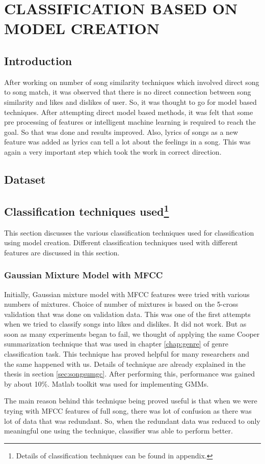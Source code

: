 \chapter{CLASSIFICATION BASED ON MODEL CREATION}
 \label{chap:modelIntro}
\section{Introduction}
After working on number of song similarity techniques which involved direct song to song match, it was observed that there is no direct connection between song similarity and likes and dislikes of user. So, it was thought to go for model based techniques. After attempting direct model based methods, it was felt that some pre processing of features or intelligent machine learning is required to reach the goal. So that was done and results improved. Also, lyrics of songs as a new feature was added as lyrics can tell a lot about the feelings in a song. This was again a very important step which took the work in correct direction.
 

\section{Dataset}
\label{sec:datamodel}


\section{Classification techniques used\protect\footnote{Details of classification techniques can be found in appendix.}}
This section discusses the various classification techniques used for classification using model creation. Different classification techniques used with different features are discussed in this section.
\subsection{Gaussian Mixture Model with MFCC}
\label{sub:GMM}
 Initially, Gaussian mixture model with MFCC features were tried with various numbers of mixtures. Choice of number of mixtures is based on the 5-cross validation that was done on validation data. This was one of the first attempts when we tried to classify songs into likes and dislikes. It did not work. But as soon as many experiments began to fail, we thought of applying the same Cooper summarization technique that was used in chapter \ref{chap:genre} of genre classification task. This technique has proved helpful for many researchers and the same happened with us. Details of technique are already explained in the thesis in section \ref{sec:songsumgc}. After performing this, performance was gained by about 10\%. Matlab toolkit was used for implementing GMMs.
\par The main reason behind this technique being proved useful is that when we were trying with MFCC features of full song, there was lot of confusion as there was lot of data that was redundant. So, when the redundant data was reduced to only meaningful one using the technique, classifier was able to perform better.

